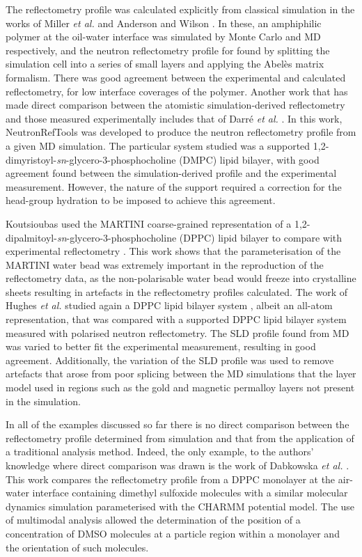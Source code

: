 \documentclass[amsmath,amssymb,twocolumn,superscriptaddress]{revtex4-1}
\begin{document}
The reflectometry profile was calculated explicitly from classical
simulation in the works of Miller \emph{et al.} and Anderson and
Wilson \cite{miller_monte_2003,anderson_molecular_2004}.
In these, an amphiphilic polymer at the oil-water interface was simulated by
Monte Carlo and MD respectively, and the neutron reflectometry profile for
found by splitting the simulation cell into a series of small layers and
applying the Abel\`{e}s matrix formalism.
There was good agreement between the experimental and calculated
reflectometry, for low interface coverages of the polymer.
Another work that has made direct comparison between the atomistic
simulation-derived reflectometry and those measured experimentally includes
that of Darr\'{e} \emph{et al.} \cite{darre_molecular_2015}.
In this work, NeutronRefTools was developed to produce the neutron
reflectometry profile from a given MD simulation.
The particular system studied was a supported
1,2-dimyristoyl-\emph{sn}-glycero-3-phosphocholine (DMPC) lipid bilayer,
with good agreement found between the simulation-derived profile and the
experimental measurement.
However, the nature of the support required a correction for the head-group
hydration to be imposed to achieve this agreement.

Koutsioubas used the MARTINI coarse-grained representation of a
1,2-dipalmitoyl-\emph{sn}-glycero-3-phosphocholine (DPPC) lipid bilayer to
compare with experimental reflectometry \cite{koutsioubas_combined_2016}.
This work shows that the parameterisation of the MARTINI water bead was
extremely important in the reproduction of the reflectometry data, as the
non-polarisable water bead would freeze into crystalline sheets resulting
in artefacts in the reflectometry profiles calculated.
The work of Hughes \emph{et al.} studied again a DPPC lipid bilayer
system \cite{hughes_interpretation_2016}, albeit an all-atom representation,
that was compared with a supported DPPC lipid bilayer system measured with
polarised neutron reflectometry.
The SLD profile found from MD was varied to better fit the experimental
measurement, resulting in good agreement.
Additionally, the variation of the SLD profile was used to remove
artefacts that arose from poor splicing between the MD simulations that the
layer model used in regions such as the gold and magnetic permalloy layers
not present in the simulation.

In all of the examples discussed so far there is no direct comparison
between the reflectometry profile determined from simulation and that from
the application of a traditional analysis method.
Indeed, the only example, to the authors' knowledge where direct comparison
was drawn is the work of
Dabkowska \emph{et al.} \cite{dabkowska_modulation_2014}.
This work compares the reflectometry profile from a DPPC monolayer at the
air-water interface containing dimethyl sulfoxide molecules with a similar
molecular dynamics simulation parameterised with the CHARMM potential model.
The use of multimodal analysis allowed the determination of the position of
a concentration of DMSO molecules at a particle region within a monolayer
and the orientation of such molecules.
\end{document}
